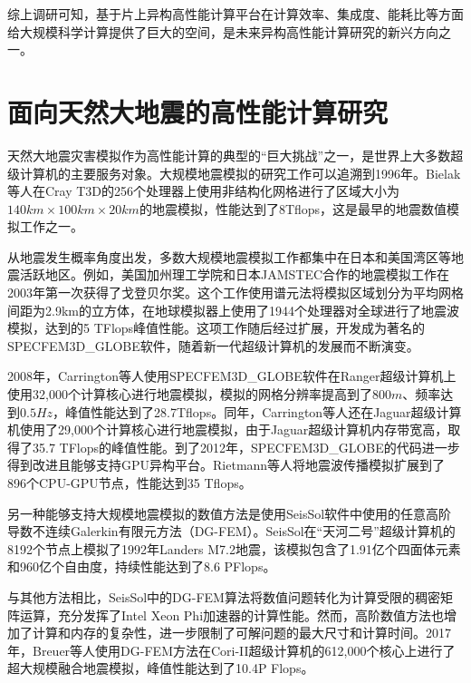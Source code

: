 \documentclass[degree=doctor]{thuthesis}
\begin{document}
综上调研可知，基于片上异构高性能计算平台在计算效率、集成度、能耗比等方面给大规模科学计算提供了巨大的空间，是未来异构高性能计算研究的新兴方向之一。

\section{面向天然大地震的高性能计算研究}

天然大地震灾害模拟作为高性能计算的典型的“巨大挑战”之一，是世界上大多数超级计算机的主要服务对象。大规模地震模拟的研究工作可以追溯到1996年。Bielak等人在Cray T3D的256个处理器上使用非结构化网格进行了区域大小为$140km \times 100km \times 20km$的地震模拟\citep{bao1996earthquake}，性能达到了8Tflops，这是最早的地震数值模拟工作之一。

从地震发生概率角度出发，多数大规模地震模拟工作都集中在日本和美国湾区等地震活跃地区。例如，美国加州理工学院和日本JAMSTEC合作的地震模拟工作在2003年第一次获得了戈登贝尔奖\citep{es-gb-2003}。这个工作使用谱元法\cite{chen2006glueball}将模拟区域划分为平均网格间距为2.9km的立方体，在地球模拟器上使用了1944个处理器对全球进行了地震波模拟，达到的5 TFlops峰值性能。这项工作随后经过扩展，开发成为著名的SPECFEM3D\_GLOBE软件\cite{bozdag2010specfem3d_globe}，随着新一代超级计算机的发展而不断演变。

2008年，Carrington等人使用SPECFEM3D\_GLOBE软件在Ranger超级计算机上使用32,000个计算核心进行地震模拟\cite{carrington2008high}，模拟的网格分辨率提高到了$800m$、频率达到$0.5Hz$，峰值性能达到了28.7Tflops。同年，Carrington等人还在Jaguar超级计算机使用了29,000个计算核心进行地震模拟，由于Jaguar超级计算机内存带宽高，取得了35.7 TFlops的峰值性能。到了2012年，SPECFEM3D\_GLOBE的代码进一步得到改进且能够支持GPU异构平台。Rietmann等人将地震波传播模拟扩展到了896个CPU-GPU节点\citep{rietmann2012forward}，性能达到35 Tflops。

另一种能够支持大规模地震模拟的数值方法是使用SeisSol软件中使用的任意高阶导数不连续Galerkin有限元方法\cite{godel2010scalability}（DG-FEM）。SeisSol在“天河二号”超级计算机的8192个节点上模拟了1992年Landers M7.2地震\citep{tianhe2-2014gb}，该模拟包含了1.91亿个四面体元素和960亿个自由度，持续性能达到了8.6 PFlops。

与其他方法相比，SeisSol中的DG-FEM算法将数值问题转化为计算受限的稠密矩阵运算，充分发挥了Intel Xeon Phi加速器的计算性能。然而，高阶数值方法也增加了计算和内存的复杂性，进一步限制了可解问题的最大尺寸和计算时间。2017年，Breuer等人使用DG-FEM方法在Cori-II超级计算机的612,000个核心上进行了超大规模融合地震模拟\citep{breuer2017edge}，峰值性能达到了10.4P Flops。
\end{document}
